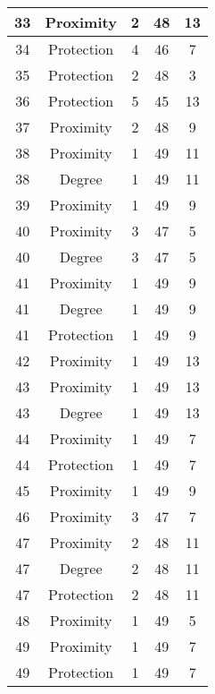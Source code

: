 \documentclass[results.tex]{subfiles}
\begin{document}
\begin{center}
\begin{tabular}{| c || c | c | c | c |}
    \hline
    33 & Proximity & 2 & 48 & 13 \\ 
    \hline
    34 & Protection & 4 & 46 & 7 \\ 
    \hline
    35 & Protection & 2 & 48 & 3 \\ 
    \hline
    36 & Protection & 5 & 45 & 13 \\ 
    \hline
    37 & Proximity & 2 & 48 & 9 \\ 
    \hline
    38 & Proximity & 1 & 49 & 11 \\ 
    \hline
    38 & Degree & 1 & 49 & 11 \\ 
    \hline
    39 & Proximity & 1 & 49 & 9 \\ 
    \hline
    40 & Proximity & 3 & 47 & 5 \\ 
    \hline
    40 & Degree & 3 & 47 & 5 \\ 
    \hline
    41 & Proximity & 1 & 49 & 9 \\ 
    \hline
    41 & Degree & 1 & 49 & 9 \\ 
    \hline
    41 & Protection & 1 & 49 & 9 \\ 
    \hline
    42 & Proximity & 1 & 49 & 13 \\ 
    \hline
    43 & Proximity & 1 & 49 & 13 \\ 
    \hline
    43 & Degree & 1 & 49 & 13 \\ 
    \hline
    44 & Proximity & 1 & 49 & 7 \\ 
    \hline
    44 & Protection & 1 & 49 & 7 \\ 
    \hline
    45 & Proximity & 1 & 49 & 9 \\ 
    \hline
    46 & Proximity & 3 & 47 & 7 \\ 
    \hline
    47 & Proximity & 2 & 48 & 11 \\ 
    \hline
    47 & Degree & 2 & 48 & 11 \\ 
    \hline
    47 & Protection & 2 & 48 & 11 \\ 
    \hline
    48 & Proximity & 1 & 49 & 5 \\ 
    \hline
    49 & Proximity & 1 & 49 & 7 \\ 
    \hline
    49 & Protection & 1 & 49 & 7 \\ 
    \hline   \end{tabular}
\end{center}
\end{document}
